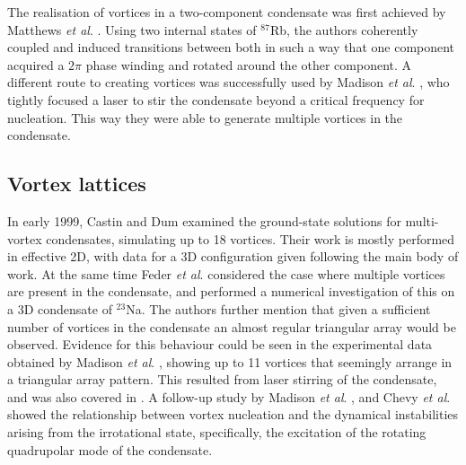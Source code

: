 The realisation of vortices in a two-component condensate was first achieved by Matthews \textit{et al}. \cite{Vtx:Matthews_prl_1999}. Using two internal states of $^{87}$Rb, the authors coherently coupled and induced transitions between both in such a way that one component acquired a $2\pi$ phase winding and rotated around the other component. A different route to creating vortices was successfully used by Madison \textit{et al}. \cite{Vtx:Madison_prl_2000}, who tightly focused a laser to stir the condensate beyond a critical frequency for nucleation. This way they were able to generate multiple vortices in the condensate.

\subsection{Vortex lattices}
In early 1999, Castin and Dum \cite{Vtx:Castin_epjd_1999} examined the ground-state solutions for multi-vortex condensates, simulating up to 18 vortices. Their work is mostly performed in effective 2D, with data for a 3D configuration given following the main body of work. At the same time Feder \textit{et al}. \cite{Vtx:Feder_pra_2000} considered the case where multiple vortices are present in the condensate, and performed a numerical investigation of this on a 3D condensate of $^{23}$Na. The authors further mention that given a sufficient number of vortices in the condensate an almost regular triangular array would be observed. Evidence for this behaviour could be seen in the experimental data obtained by Madison \textit{et al}. \cite{Vtx:Madison_jmo_2000}, showing up to 11 vortices that seemingly arrange in a triangular array pattern. This resulted from laser stirring of the condensate, and was also covered in \cite{Vtx:Madison_prl_2000}. A follow-up study by Madison \textit{et al}. \cite{Vtx:Madison_prl_2001}, and Chevy \textit{et al}. \cite{Vtx:Chevy_aoi_2001} showed the relationship between vortex nucleation and the dynamical instabilities arising from the irrotational state, specifically, the excitation of the rotating quadrupolar mode of the condensate.


